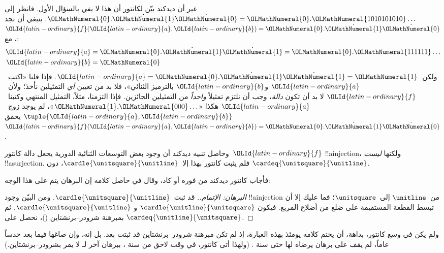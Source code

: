 \documentclass[../../../include/open-logic-section]{subfiles}
\begin{document}
غير أن ديدكند بيّن لكانتور أن هذا لا يفي بالسؤال الأول. فانظر إلى
${\OLMathNumeral{0}}.\dot{{\OLMathNumeral{1}}}\dot{{\OLMathNumeral{0}}} = {\OLMathNumeral{0}}.{\OLMathNumeral{1010101010}}\ldots$. ينبغي أن نجد
${\OLId{latin-ordinary}{f}}({\OLId{latin-ordinary}{a}},{\OLId{latin-ordinary}{b}}) = {\OLMathNumeral{0}}.\dot{{\OLMathNumeral{1}}}\dot{{\OLMathNumeral{0}}}$، مع:
\begin{align*}
{\OLId{latin-ordinary}{a}}&= {\OLMathNumeral{0}}.\dot{{\OLMathNumeral{1}}}\dot{{\OLMathNumeral{1}}} = {\OLMathNumeral{0}}.{\OLMathNumeral{111111}}\ldots\\
{\OLId{latin-ordinary}{b}}&= {\OLMathNumeral{0}}
\end{align*}
ولكن~${\OLId{latin-ordinary}{a}} = {\OLMathNumeral{0}}.\dot{{\OLMathNumeral{1}}}\dot{{\OLMathNumeral{1}}} = {\OLMathNumeral{1}}$. فإذا قلنا «اكتب~${\OLId{latin-ordinary}{a}}$ و${\OLId{latin-ordinary}{b}}$ بالترميز
الثنائي»، فلا بد من تعيين \emph{أي} التمثيلين نأخذ؛ ولأن~${\OLId{latin-ordinary}{f}}$ لا بد أن
تكون \emph{دالة}، وجب أن نلتزم تمثيلاً \emph{واحداً} من التمثيلين
الجائزين. فإذا التزمنا، مثلاً، التمثيل المنتهي وكتبنا~${\OLId{latin-ordinary}{a}}$ هكذا
«${\OLMathNumeral{1}}.{\OLMathNumeral{000}}\ldots$»، لم يوجد زوج~$\tuple{{\OLId{latin-ordinary}{a}}, {\OLId{latin-ordinary}{b}}}$ يحقق
${\OLId{latin-ordinary}{f}}({\OLId{latin-ordinary}{a}}, {\OLId{latin-ordinary}{b}}) = {\OLMathNumeral{0}}.\dot{{\OLMathNumeral{1}}}\dot{{\OLMathNumeral{0}}}$.

وحاصل تنبيه ديدكند أن وجود بعض التوسعات الثنائية الدورية يجعل دالة
كانتور~${\OLId{latin-ordinary}{f}}$ !!a{injection}، ولكنها \emph{ليست} !!a{surjection}. فلم يثبت
كانتور بهذا إلا~$\cardle{\unitsquare}{\unitline}$، دون
$\cardeq{\unitsquare}{\unitline}$.

فأجاب كانتور ديدكند من فوره أو كاد، وقال في حاصل كلامه إن البرهان يتم على
هذا الوجه:

\begin{proof}[البرهان: الإتمام.]
قد ثبت~$\cardle{\unitsquare}{\unitline}$. ومن البيّن وجود !!a{injection}
من~$\unitline$ إلى~$\unitsquare$؛ فما عليك إلا أن تبسط القطعة المستقيمة
على ضلع من أضلاع المربع. فيكون
$\cardle{\unitline}{\unitsquare}$ و
$\cardle{\unitsquare}{\unitline}$. ثم بمبرهنة شرودر--برنشتاين
()، نحصل على
$\cardeq{\unitline}{\unitsquare}$.
\end{proof}

ولم يكن في وسع كانتور، بداهة، أن يختم كلامه يومئذ بهذه العبارة، إذ لم تكن
مبرهنة شرودر--برنشتاين قد ثبتت بعد. بل إنه، وإن صاغها فيما بعد حدساً
عاماً، لم يقف على برهان يرضاه لها حتى سنة . (ولهذا أتى كانتور، في
وقت لاحق من سنة ، ببرهان آخر لـ لا يمر
بشرودر--برنشتاين.)
\end{document}
